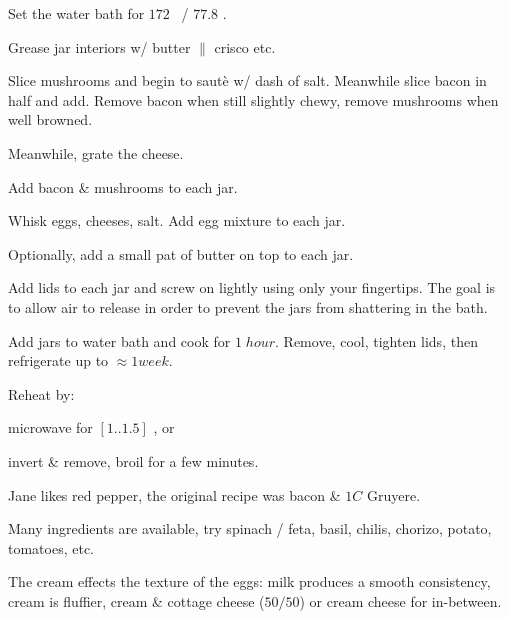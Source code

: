 \begin{preparation}
\item Set the water bath for $172$ \Fahrenheit~/ $77.8$ \Celsius.

\item Grease jar interiors w/ butter $\|$ crisco etc.

\item Slice mushrooms and begin to saut\`{e} w/ dash of salt. Meanwhile slice bacon in half and add.
	Remove bacon when still slightly chewy, remove mushrooms when well browned.

\item Meanwhile, grate the cheese.

\item Add bacon \& mushrooms to each jar.

\item Whisk eggs, cheeses, salt. Add egg mixture to each jar.

\item Optionally, add a small pat of butter on top to each jar.

\item Add lids to each jar and screw on lightly using only your fingertips. The goal is to allow air to release in order to prevent the jars from shattering in the bath.

\item Add jars to water bath and cook for $1\; hour$. Remove, cool, tighten lids, then refrigerate up to $\approx1 week$.

\item Reheat by:
\begin{inparaenum}
	\item microwave for $[1..1.5]$ \minute, or
	\item invert \& remove, broil for a few minutes.
\end{inparaenum}

\end{preparation}


\begin{variation}
\item Jane likes red pepper, the original recipe was bacon \& $1 C$ Gruyere.
\item Many ingredients are available, try spinach / feta, basil, chilis, chorizo, potato, tomatoes, etc.
\end{variation}


\begin{experiments}
\item The cream effects the texture of the eggs: milk produces a smooth consistency, cream is fluffier, cream \& cottage cheese ($50/50$) or cream cheese for in-between.
\end{experiments}


\recipeend%
